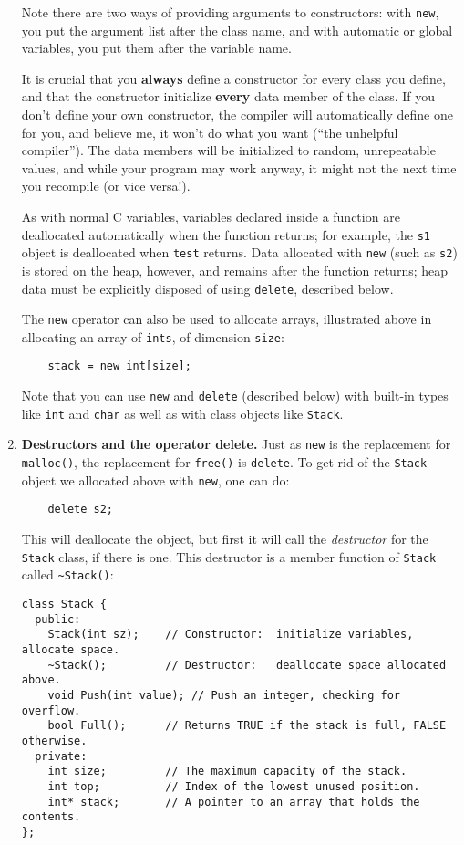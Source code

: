 \begin{enumerate}
Note there are two ways of providing arguments to constructors: with
{\tt new}, you put the argument list after the class name, and with
automatic or global variables, you put them after the variable name.

It is crucial that you {\bf always} define a constructor
for every class you define, and that the constructor initialize
{\bf every} data member of the class.  If you don't define
your own constructor, the compiler will automatically define
one for you, and believe me, it won't do what you want
(``the unhelpful compiler'').
The data members will be initialized to random, unrepeatable
values, and while your program may work anyway, it might not
the next time you recompile (or vice versa!).

As with normal C variables, variables declared inside a function
are deallocated automatically when the function returns; for
example, the {\tt s1} object is deallocated when {\tt test}
returns.  Data allocated with {\tt new} (such as {\tt s2}) is
stored on the heap, however, and remains after the function returns;
heap data must be explicitly disposed of using {\tt delete}, described below.

The {\tt new} operator can also be used to allocate arrays, illustrated
above in allocating an array of {\tt ints}, of dimension {\tt size}:

\begin{verbatim}
    stack = new int[size];
\end{verbatim}

Note that you can use {\tt new} and {\tt delete} (described below)
with built-in types like {\tt int} and {\tt char} as well as with
class objects like {\tt Stack}.

\item {\bf Destructors and the operator delete.}  Just as {\tt new} is the
replacement for {\tt malloc()}, the replacement for {\tt free()} is
{\tt delete}.  To get rid of the {\tt Stack} object we allocated
above with {\tt new}, one can do:

\begin{verbatim}
    delete s2;
\end{verbatim}

This will deallocate the object, but first it will call the
{\it destructor} for the {\tt Stack} class, if there is one.  This
destructor is a member function of {\tt Stack} called {\tt {\verb^~^}Stack()}:

\begin{verbatim}
class Stack {
  public:
    Stack(int sz);    // Constructor:  initialize variables, allocate space.
    ~Stack();         // Destructor:   deallocate space allocated above.
    void Push(int value); // Push an integer, checking for overflow.
    bool Full();      // Returns TRUE if the stack is full, FALSE otherwise.
  private:
    int size;         // The maximum capacity of the stack.
    int top;          // Index of the lowest unused position.
    int* stack;       // A pointer to an array that holds the contents.
};


\end{verbatim}
\end{enumerate}
